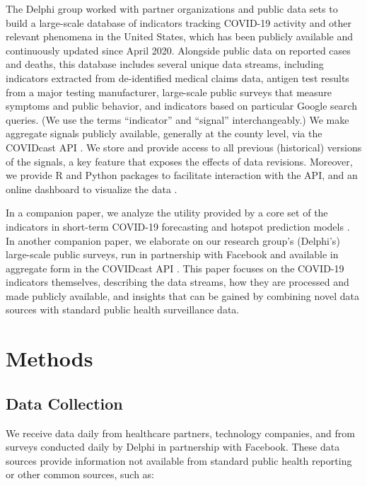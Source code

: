 \documentclass[9pt,twocolumn,twoside,lineno]{pnas-new}
\begin{document}
The Delphi group worked with partner organizations and public data sets to build
a large-scale database of indicators tracking COVID-19 activity and other
relevant phenomena in the United States, which has been publicly available and
continuously updated since April 2020. Alongside public data on reported cases
and deaths, this database includes several unique data streams, including
indicators extracted from de-identified medical claims data, antigen test
results from a major testing manufacturer, large-scale public surveys that
measure symptoms and public behavior, and indicators based on particular Google
search queries. (We use the terms ``indicator'' and ``signal'' interchangeably.)
We make aggregate signals publicly available, generally at the county level, via
the COVIDcast API \cite{CovidcastAPI}. We store and provide access to all
previous (historical) versions of the signals, a key feature that exposes the
effects of data revisions. Moreover, we provide R \cite{CovidcastR} and Python 
\cite{CovidcastPy} packages to facilitate interaction with the API, and an
online dashboard to visualize the data \cite{CovidcastViz}.

In a companion paper, we analyze the utility provided by a core set of the
indicators in short-term COVID-19 forecasting and hotspot prediction models 
\cite{McDonald:2021}. In another companion paper, we elaborate on our research
group's (Delphi's) large-scale public surveys, run in partnership with Facebook
and available in aggregate form in the COVIDcast API \cite{Salomon:2021}. This
paper focuses on the COVID-19 indicators themselves, describing the
data streams, how they are processed and made publicly available, and insights
that can be gained by combining novel data sources with standard public health
surveillance data.

\section{Methods}

\subsection{Data Collection}

We receive data daily from healthcare partners, technology companies, and from
surveys conducted daily by Delphi in partnership with Facebook. These data
sources provide information not available from standard public health reporting
or other common sources, such as:
\end{document}
